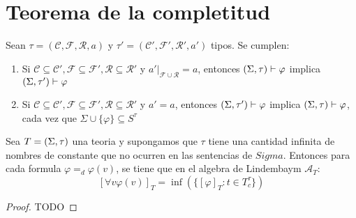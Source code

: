 
\section{Teorema de la completitud}

\begin{lemma}
  Sean $\tau=(\mathcal{C},\mathcal{F},\mathcal{R},a)$ y $\tau'=(\mathcal{C}',\mathcal{F}',\mathcal{R}',a')$ tipos. Se cumplen: \begin{enumerate}
    \item Si $\mathcal{C}\subseteq\mathcal{C}', \mathcal{F}\subseteq\mathcal{F}',\mathcal{R}\subseteq\mathcal{R}'$ y $a'|_{\mathcal{F}\cup\mathcal{R}}=a$,
    entonces $(\Sigma,\tau)\vdash\varphi$ implica $(\Sigma,\tau')\vdash\varphi$
    \item Si $\mathcal{C}\subseteq\mathcal{C}', \mathcal{F}\subseteq\mathcal{F}',\mathcal{R}\subseteq\mathcal{R}'$ y $a'=a$, entonces $(\Sigma,\tau')\vdash\varphi$
    implica $(\Sigma,\tau)\vdash\varphi$, cada vez que $\Sigma\cup\{\varphi\}\subseteq S^\tau$
  \end{enumerate} 
\end{lemma}
\noproof

\begin{lemma}
  Sea $T=(\Sigma,\tau)$ una teoria y supongamos que $\tau$ tiene una cantidad infinita de nombres de constante que no ocurren en las sentencias de $Sigma$.
  Entonces para cada formula $\varphi=_d\varphi(v)$, se tiene que en el algebra de Lindembaym $\mathcal{A}_T$:
  $$
  [\forall v\varphi(v)]_T=\inf(\{[\varphi]_T:t\in T_c^\tau\})
  $$
  
\end{lemma}
\begin{proof}
  TODO
\end{proof}

